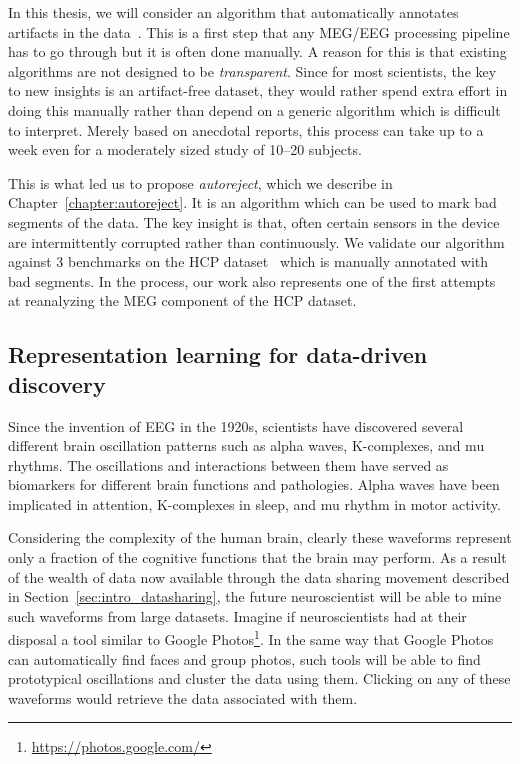 In this thesis, we will consider an algorithm that automatically annotates artifacts in the data~\citep{jas2016automated, jas2017autoreject}. This is a first step that any \ac{MEG}/\ac{EEG} processing pipeline has to go through but it is often done manually. A reason for this is that existing algorithms are not designed to be \emph{transparent}. Since for most scientists, the key to new insights is an artifact-free dataset, they would rather spend extra effort in doing this manually rather than depend on a generic algorithm which is difficult to interpret. %
Merely based on anecdotal reports, this process can take up to a week even for a moderately sized study of 10--20 subjects.

This is what led us to propose \emph{autoreject}, which we describe in Chapter~\ref{chapter:autoreject}. It is an algorithm which can be used to mark bad segments of the data. The key insight is that, often certain sensors in the device are intermittently corrupted rather than continuously. We validate our algorithm against 3 benchmarks on the \ac{HCP} dataset~\citep{larson2013adding} which is manually annotated with bad segments. In the process, our work also represents one of the first attempts at reanalyzing the MEG component of the HCP dataset.

\subsection*{Representation learning for data-driven discovery}
\label{sec:sommaire:representation_learning}
Since the invention of \ac{EEG} in the 1920s, scientists have discovered several different brain oscillation patterns such as alpha waves, K-complexes, and mu rhythms. The oscillations and interactions between them have served as biomarkers for different brain functions and pathologies. Alpha waves have been implicated in attention, K-complexes in sleep, and mu rhythm in motor activity. 

Considering the complexity of the human brain, clearly these waveforms represent only a fraction of the cognitive functions that the brain may perform. As a result of the wealth of data now available through the data sharing movement described in Section~\ref{sec:intro_datasharing}, the future neuroscientist will be able to mine such waveforms from large datasets. Imagine if neuroscientists had at their disposal a tool similar to Google Photos\footnote{\url{https://photos.google.com/}}. In the same way that Google Photos can automatically find faces and group photos, such tools will be able to find prototypical oscillations and cluster the data using them. Clicking on any of these waveforms would retrieve the data associated with them.

